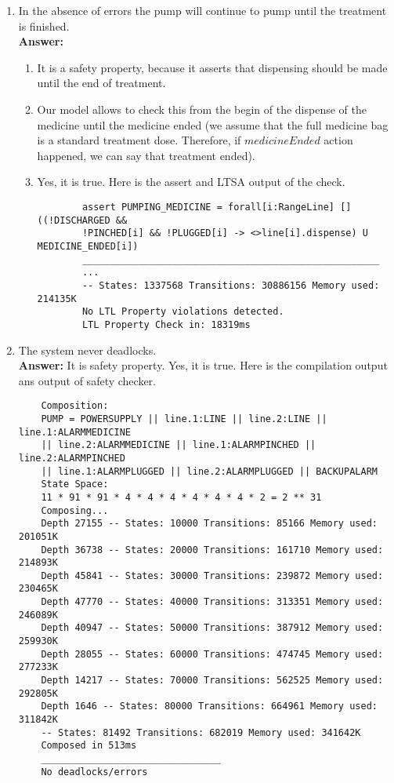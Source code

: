 \documentclass{article}
\begin{document}
\begin{enumerate}
    \item In the absence of errors the pump will continue to pump until the treatment is finished.\\
    \textbf{Answer:} 
    \begin{enumerate}
    	\item It is a safety property, because it asserts that dispensing should be made until the end of treatment.
    	\item Our model allows to check this from the begin of the dispense of the medicine until the medicine ended 
    	(we assume that the full medicine bag is a standard treatment dose. Therefore, if $medicineEnded$ action happened, we
    	can say that treatment ended).
    	\item Yes, it is true. Here is the assert and LTSA output of the check.
    	\begin{verbatim}
    	assert PUMPING_MEDICINE = forall[i:RangeLine] []((!DISCHARGED && 
    	!PINCHED[i] && !PLUGGED[i] -> <>line[i].dispense) U MEDICINE_ENDED[i])
    	_____________________________________________________
	    ...
    	-- States: 1337568 Transitions: 30886156 Memory used: 214135K
    	No LTL Property violations detected.
    	LTL Property Check in: 18319ms
\end{verbatim}
	\end{enumerate}
    \item The system never deadlocks.\\
    \textbf{Answer:} 
    It is safety property. Yes, it is true. Here is the compilation output ans output of safety checker.
    \begin{verbatim}
    Composition:
    PUMP = POWERSUPPLY || line.1:LINE || line.2:LINE || line.1:ALARMMEDICINE
    || line.2:ALARMMEDICINE || line.1:ALARMPINCHED || line.2:ALARMPINCHED 
    || line.1:ALARMPLUGGED || line.2:ALARMPLUGGED || BACKUPALARM
    State Space:
    11 * 91 * 91 * 4 * 4 * 4 * 4 * 4 * 4 * 2 = 2 ** 31
    Composing...
    Depth 27155 -- States: 10000 Transitions: 85166 Memory used: 201051K
    Depth 36738 -- States: 20000 Transitions: 161710 Memory used: 214893K
    Depth 45841 -- States: 30000 Transitions: 239872 Memory used: 230465K
    Depth 47770 -- States: 40000 Transitions: 313351 Memory used: 246089K
    Depth 40947 -- States: 50000 Transitions: 387912 Memory used: 259930K
    Depth 28055 -- States: 60000 Transitions: 474745 Memory used: 277233K
    Depth 14217 -- States: 70000 Transitions: 562525 Memory used: 292805K
    Depth 1646 -- States: 80000 Transitions: 664961 Memory used: 311842K
    -- States: 81492 Transitions: 682019 Memory used: 341642K
    Composed in 513ms
    ________________________________
    No deadlocks/errors
    \end{verbatim}
       

\end{enumerate}
\end{document}
